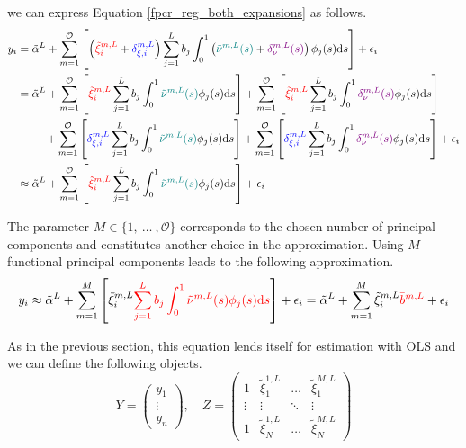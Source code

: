 \documentclass[11pt,twoside,a4paper]{article}
\begin{document}
	we can express Equation \ref{fpcr_reg_both_expansions} as follows.
	\begin{equation}
		\begin{split}
			y_i & = \tilde{\alpha}^L
			+ \sum_{m = 1}^{\mathcal{O}} \left[ \left({\color{red}\tilde{\xi}^{m,L}_{i}} + {\color{blue}\delta_{\xi, i}^{m, L} }\right) \sum_{j = 1}^{L} b_j \int_{0}^{1} \left({\color{teal}\tilde{\nu}^{m,L}(s)} + {\color{violet}\delta_{\nu}^{m,L}(s)} \right) \phi_j(s) \mathrm{d}s \right] 
			+ \epsilon_i \\
			& = \tilde{\alpha}^L
			+ \sum_{m = 1}^{\mathcal{O}} \left[ {\color{red}\tilde{\xi}^{m,L}_{i}} \sum_{j = 1}^{L} b_j \int_{0}^{1} {\color{teal}\tilde{\nu}^{m,L}(s)} \phi_j(s) \mathrm{d}s \right] 
			+ \sum_{m = 1}^{\mathcal{O}} \left[ {\color{red}\tilde{\xi}^{m,L}_{i}} \sum_{j = 1}^{L} b_j \int_{0}^{1} {\color{violet}\delta_{\nu}^{m,L}(s)} \phi_j(s) \mathrm{d}s \right] \\
			& \quad \quad \: \: + \sum_{m = 1}^{\mathcal{O}} \left[ {\color{blue}\delta_{\xi, i}^{m, L}} \sum_{j = 1}^{L} b_j \int_{0}^{1} {\color{teal}\tilde{\nu}^{m,L}(s)} \phi_j(s) \mathrm{d}s \right] 
			+ \sum_{m = 1}^{\mathcal{O}} \left[ {\color{blue}\delta_{\xi, i}^{m, L}} \sum_{j = 1}^{L} b_j \int_{0}^{1} {\color{violet}\delta_{\nu}^{m,L}(s)} \phi_j(s) \mathrm{d}s \right]
			+ \epsilon_i \\
			& \approx \tilde{\alpha}^L
			+ \sum_{m = 1}^{\mathcal{O}} \left[ {\color{red}\tilde{\xi}^{m,L}_{i}} \sum_{j = 1}^{L} b_j \int_{0}^{1} {\color{teal}\tilde{\nu}^{m,L}(s)} \phi_j(s) \mathrm{d}s \right] + \epsilon_i
		\end{split}
	\end{equation}

	The parameter $M \in \{1,\: \dots \:, \mathcal{O}\}$ corresponds to the chosen number of principal components and constitutes another choice in the approximation. Using $M$ functional principal components leads to the following approximation.
	\begin{equation}
		y_i \approx \tilde{\alpha}^L
		+ \sum_{m = 1}^{M} \left[ \tilde{\xi}^{m,L}_{i} {\color{red}\sum_{j = 1}^{L} b_j \int_{0}^{1} \tilde{\nu}^{m,L}(s) \phi_j(s) \mathrm{d}s} \right] + \epsilon_i 
		= \tilde{\alpha}^L
		+ \sum_{m = 1}^{M} \tilde{\xi}^{m,L}_{i} {\color{red}\bar{b}^{m,L}} + \epsilon_i
	\end{equation}
	
	As in the previous section, this equation lends itself for estimation with OLS and we can define the following objects.
	\begin{equation}
		Y = \begin{pmatrix}
			y_1 \\ \vdots \\ y_n
		\end{pmatrix}, \quad
		Z = \begin{pmatrix}
			1 & \tilde{\xi}^{1,L}_{1} & \dots & \tilde{\xi}^{M,L}_{1} \\
			\vdots & \vdots & \ddots & \vdots \\
			1 & \tilde{\xi}^{1,L}_{N} & \dots & \tilde{\xi}^{M,L}_{N}
		\end{pmatrix}
	\end{equation}
	
\end{document}
